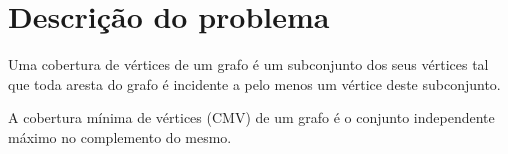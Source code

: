 \part{Descrição do problema}
\label{part:descricao}

Uma cobertura de vértices de um grafo é um subconjunto dos seus
vértices tal que toda aresta do grafo é incidente a pelo menos um
vértice deste subconjunto.

A cobertura mínima de vértices (CMV) de um grafo é o conjunto independente
máximo no complemento do mesmo.







